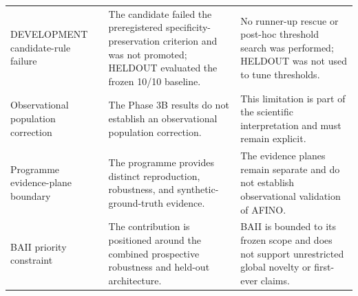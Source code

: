 \begin{longtable}{@{}>{\RaggedRight\arraybackslash}p{}>{\RaggedRight\arraybackslash}p{}>{\RaggedRight\arraybackslash}p{}@{}}
DEVELOPMENT candidate-rule failure & The candidate failed the preregistered specificity-preservation criterion and was not promoted; HELDOUT evaluated the frozen 10/10 baseline. & No runner-up rescue or post-hoc threshold search was performed; HELDOUT was not used to tune thresholds. \\
Observational population correction & The Phase 3B results do not establish an observational population correction. & This limitation is part of the scientific interpretation and must remain explicit. \\
Programme evidence-plane boundary & The programme provides distinct reproduction, robustness, and synthetic-ground-truth evidence. & The evidence planes remain separate and do not establish observational validation of AFINO. \\
BAII priority constraint & The contribution is positioned around the combined prospective robustness and held-out architecture. & BAII is bounded to its frozen scope and does not support unrestricted global novelty or first-ever claims. \\
\bottomrule
\end{longtable}
